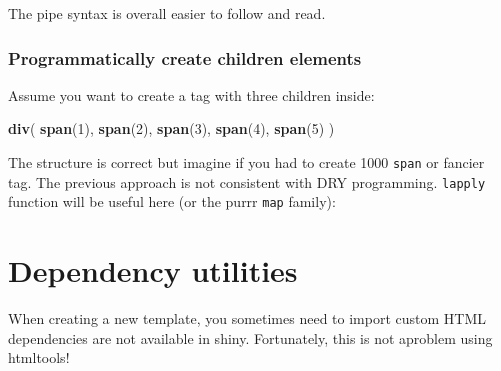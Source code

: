 \documentclass[
]{book}
\newenvironment{Shaded}{\begin{snugshade}}{\end{snugshade}}
\newcommand{\CommentTok}[1]{\textcolor[rgb]{0.56,0.35,0.01}{\textit{#1}}}
\newcommand{\ControlFlowTok}[1]{\textcolor[rgb]{0.13,0.29,0.53}{\textbf{#1}}}
\newcommand{\DecValTok}[1]{\textcolor[rgb]{0.00,0.00,0.81}{#1}}
\newcommand{\KeywordTok}[1]{\textcolor[rgb]{0.13,0.29,0.53}{\textbf{#1}}}
\newcommand{\NormalTok}[1]{#1}
\newcommand{\OperatorTok}[1]{\textcolor[rgb]{0.81,0.36,0.00}{\textbf{#1}}}
\newcommand{\StringTok}[1]{\textcolor[rgb]{0.31,0.60,0.02}{#1}}
\begin{document}
The pipe syntax is overall easier to follow and read.

\hypertarget{programmatically-create-children-elements}{%
\subsection{Programmatically create children elements}\label{programmatically-create-children-elements}}

Assume you want to create a tag with three children inside:

\begin{Shaded}
\begin{Highlighting}[]
\KeywordTok{div}\NormalTok{(}
  \KeywordTok{span}\NormalTok{(}\DecValTok{1}\NormalTok{),}
  \KeywordTok{span}\NormalTok{(}\DecValTok{2}\NormalTok{),}
  \KeywordTok{span}\NormalTok{(}\DecValTok{3}\NormalTok{),}
  \KeywordTok{span}\NormalTok{(}\DecValTok{4}\NormalTok{),}
  \KeywordTok{span}\NormalTok{(}\DecValTok{5}\NormalTok{)}
\NormalTok{)}
\end{Highlighting}
\end{Shaded}

The structure is correct but imagine if you had to create 1000 \texttt{span} or fancier tag. The previous approach is not consistent with DRY programming. \texttt{lapply} function will be useful here (or the purrr \texttt{map} family):

\begin{Shaded}
\end{Shaded}

\hypertarget{htmltools-dependencies}{%
\chapter{Dependency utilities}\label{htmltools-dependencies}}

When creating a new template, you sometimes need to import custom HTML dependencies
are not available in shiny. Fortunately, this is not aproblem using htmltools!
\end{document}
